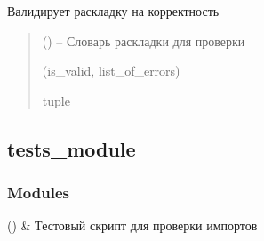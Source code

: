 \documentclass[a4paper,11pt,russian,openany,oneside]{sphinxmanual}
\begin{document}
\begin{savenotes}\begin{fulllineitems}
\label{\detokenize{_autosummary/scan_module.read_layout:scan_module.read_layout.validate_layout}}
\pysigstartsignatures
\pysiglinewithargsret
{}
{}
{}
\pysigstopsignatures
\sphinxAtStartPar
Валидирует раскладку на корректность
\begin{quote}\begin{description}
\sphinxAtStartPar
{} () – Словарь раскладки для проверки

\sphinxAtStartPar
(is\_valid, list\_of\_errors)

\sphinxAtStartPar
tuple

\end{description}\end{quote}

\end{fulllineitems}\end{savenotes}


\sphinxstepscope


\subsection{tests\_module}
\label{\detokenize{_autosummary/tests_module:module-tests_module}}\label{\detokenize{_autosummary/tests_module:tests-module}}\label{\detokenize{_autosummary/tests_module::doc}}\subsubsection*{Modules}


\begin{savenotes}\sphinxattablestart
\sphinxthistablewithglobalstyle
\sphinxthistablewithnovlinesstyle
\centering
\begin{tabulary}{\linewidth}[t]{}
\sphinxtoprule
\sphinxtableatstartofbodyhook
\sphinxAtStartPar
{\hyperref[\detokenize{tests_module:module-tests_module.test_imports}]{}} ()
&
\sphinxAtStartPar
Тестовый скрипт для проверки импортов
\\
\sphinxbottomrule
\end{tabulary}
\sphinxtableafterendhook\par
\sphinxattableend\end{savenotes}
\end{document}
